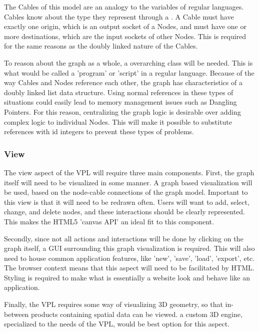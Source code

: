 The Cables of this model are an analogy to the variables of regular languages. 
Cables know about the type they represent through a . 
A Cable must have exactly one origin, which is an output socket of a Nodes, 
and must have one or more destinations, which are the input sockets of other Nodes.
This is required for the same reasons as the doubly linked nature of the Cables. 
 
To reason about the graph as a whole, a overarching  class will be needed.
This is what would be called a 'program' or 'script' in a regular language. 
Because of the way Cables and Nodes reference each other, the graph has characteristics of a doubly linked list data structure. 
Using normal references in these types of situations could easily lead to memory management issues such as Dangling Pointers.
For this reason, centralizing the graph logic is desirable over adding complex logic to individual Nodes. 
This will make it possible to substitute references with id integers to prevent these types of problems. 



\subsubsection*{View}
\label{sec:method-view}

The view aspect of the VPL will require three main components. 
First, the graph itself will need to be visualized in some manner.
A graph based visualization will be used, based on the node-cable connections of the graph model. 
Important to this view is that it will need to be redrawn often. 
Users will want to add, select, change, and delete nodes, and these interactions should be clearly represented. 
This makes the HTML5 'canvas API' an ideal fit to this component.

Secondly, since not all actions and interactions will be done by clicking on the graph itself, a \ac{GUI} surrounding this graph visualization is required.
This will also need to house common application features, like 'new', 'save', 'load', 'export', etc.  
The browser context means that this aspect will need to be facilitated by HTML. 
Styling is required to make what is essentially a website look and behave like an application. 

Finally, the VPL requires some way of visualizing 3D geometry, so that in-between products containing spatial data can be viewed. 
a custom 3D engine, specialized to the needs of the VPL, would be best option for this aspect.


